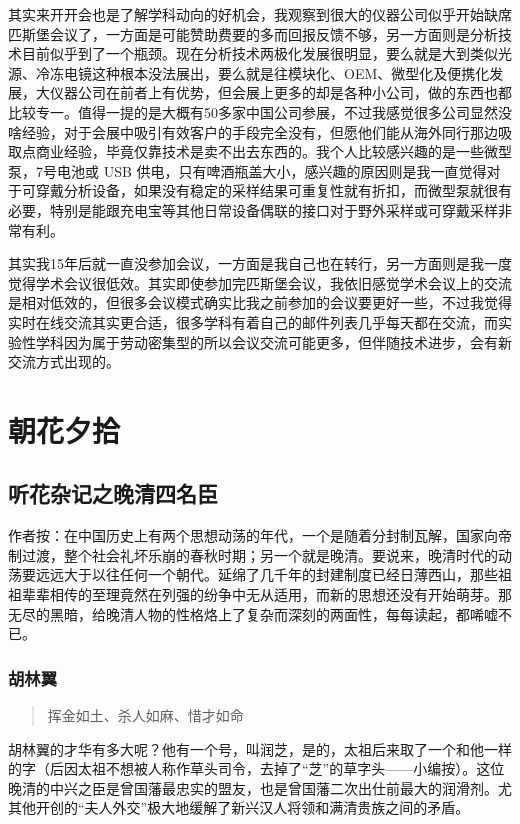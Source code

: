 \documentclass[]{book}
\begin{document}
其实来开开会也是了解学科动向的好机会，我观察到很大的仪器公司似乎开始缺席匹斯堡会议了，一方面是可能赞助费要的多而回报反馈不够，另一方面则是分析技术目前似乎到了一个瓶颈。现在分析技术两极化发展很明显，要么就是大到类似光源、冷冻电镜这种根本没法展出，要么就是往模块化、OEM、微型化及便携化发展，大仪器公司在前者上有优势，但会展上更多的却是各种小公司，做的东西也都比较专一。值得一提的是大概有50多家中国公司参展，不过我感觉很多公司显然没啥经验，对于会展中吸引有效客户的手段完全没有，但愿他们能从海外同行那边吸取点商业经验，毕竟仅靠技术是卖不出去东西的。我个人比较感兴趣的是一些微型泵，7号电池或
USB
供电，只有啤酒瓶盖大小，感兴趣的原因则是我一直觉得对于可穿戴分析设备，如果没有稳定的采样结果可重复性就有折扣，而微型泵就很有必要，特别是能跟充电宝等其他日常设备偶联的接口对于野外采样或可穿戴采样非常有利。

其实我15年后就一直没参加会议，一方面是我自己也在转行，另一方面则是我一度觉得学术会议很低效。其实即使参加完匹斯堡会议，我依旧感觉学术会议上的交流是相对低效的，但很多会议模式确实比我之前参加的会议要更好一些，不过我觉得实时在线交流其实更合适，很多学科有着自己的邮件列表几乎每天都在交流，而实验性学科因为属于劳动密集型的所以会议交流可能更多，但伴随技术进步，会有新交流方式出现的。

\chapter{朝花夕拾}

\section{听花杂记之晚清四名臣}

作者按：在中国历史上有两个思想动荡的年代，一个是随着分封制瓦解，国家向帝制过渡，整个社会礼坏乐崩的春秋时期；另一个就是晚清。要说来，晚清时代的动荡要远远大于以往任何一个朝代。延绵了几千年的封建制度已经日薄西山，那些祖祖辈辈相传的至理竟然在列强的纷争中无从适用，而新的思想还没有开始萌芽。那无尽的黑暗，给晚清人物的性格烙上了复杂而深刻的两面性，每每读起，都唏嘘不已。

\subsection{胡林翼}

\begin{quote}
挥金如土、杀人如麻、惜才如命
\end{quote}

胡林翼的才华有多大呢？他有一个号，叫润芝，是的，太祖后来取了一个和他一样的字（后因太祖不想被人称作草头司令，去掉了``芝''的草字头------小编按）。这位晚清的中兴之臣是曾国藩最忠实的盟友，也是曾国藩二次出仕前最大的润滑剂。尤其他开创的``夫人外交''极大地缓解了新兴汉人将领和满清贵族之间的矛盾。
\end{document}
